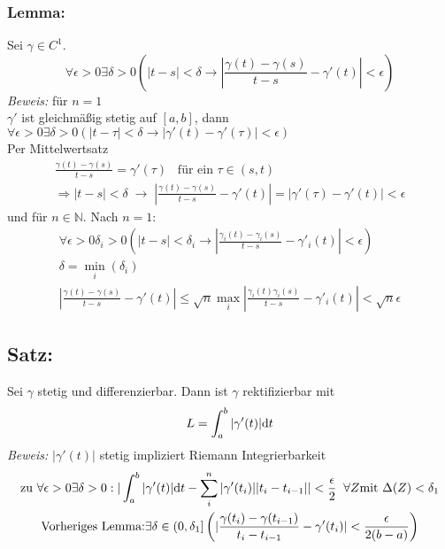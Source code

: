 \subsubsection{Lemma: }
Sei $\gamma\in C^1$.
\begin{equation}
	\forall\epsilon>0\exists\delta>0\left(
	|t-s|<\delta \rightarrow
	|\frac{\gamma(t)-\gamma(s)}{t-s} - \gamma'(t)|<\epsilon
	\right)
\end{equation}
\textit{Beweis: } für $n=1$\\
$\gamma'$ ist gleichmäßig stetig auf $[a,b]$, dann $\forall\epsilon>0\exists\delta>0\left(|t-\tau|<\delta\rightarrow |\gamma'(t) - \gamma'(\tau)|<\epsilon\right)$\\
Per Mittelwertsatz
\begin{gather}
	\frac{\gamma(t) - \gamma(s)}{t-s} = \gamma'(\tau) \;\;\;\text{für ein $\tau\in(s,t)$}\\
	\Rightarrow |t-s|<\delta \;\rightarrow\;|\frac{\gamma(t)-\gamma(s)}{t-s}-\gamma'(t)| = |\gamma'(\tau) - \gamma'(t)| <\epsilon
\end{gather}
und für $n\in\mathbb N$. Nach $n=1$:
\begin{gather}
	\forall\epsilon>0\delta_i>0\left(|t-s|<\delta_i \rightarrow |\frac{\gamma_i(t) - \gamma_i(s)}{t-s} - \gamma'_i(t)|<\epsilon\right)\\
	\delta = \min_i(\delta_i)\\
	|\frac{\gamma(t) - \gamma(s)}{t-s} - \gamma'(t)| \leq \sqrt n \max_i |\frac{\gamma_i(t) \gamma_i(s)}{t-s} - \gamma'_i(t)| < \sqrt n\epsilon
\end{gather}

\subsection{Satz: }
Sei $\gamma$ stetig und differenzierbar. Dann ist $\gamma$ rektifizierbar mit
\begin{equation}
	L = \int_a^b |\gamma'(t)|\text dt
\end{equation}
\textit{Beweis:} $|\gamma'(t)|$ stetig impliziert Riemann Integrierbarkeit
\begin{gather}
	\text{zu } \forall\epsilon>0\exists\delta>0: |\int_a^b |\gamma'(t)|\text dt - \sum_i^n |\gamma'(t_i)||t_i - t_{i-1}||< \frac{\epsilon}{2}\;\;\forall Z \text{mit $\Delta(Z) < \delta_1$}\\
	\text{Vorheriges Lemma:} \exists\delta\in(0,\delta_1]\left(|\frac{\gamma(t_i) - \gamma(t_{i-1})}{t_i - t_{i-1}} - \gamma'(t_i)|<\frac{\epsilon}{2(b-a)}\right)
\end{gather}


